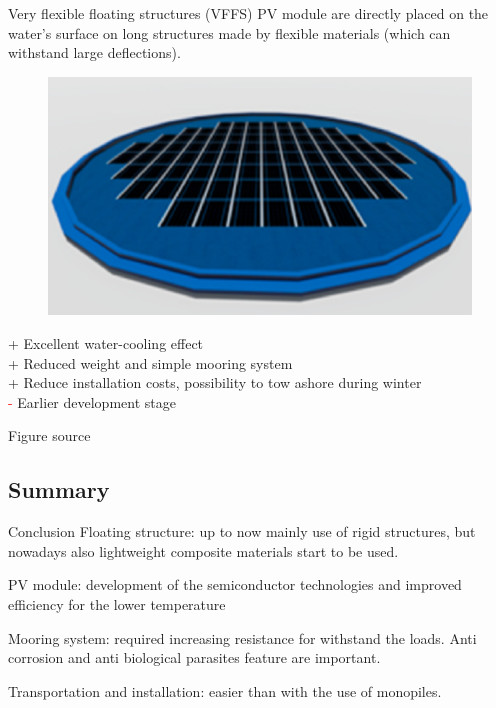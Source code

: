 \documentclass[aspectratio=169, 12pt]{beamer}
\begin{document}
\begin{frame}{Very flexible floating structures (VFFS)}
  PV module are directly placed on the water's surface on long structures made by flexible materials (which can withstand large deflections).

  \begin{figure}
    \centering
    \includegraphics[width=0.3\columnwidth]{figure/vffs.png}
  \end{figure}

  \textcolor{NTNUgreen}{+} Excellent water-cooling effect\\
  \textcolor{NTNUgreen}{+} Reduced weight and simple mooring system\\
  \textcolor{NTNUgreen}{+} Reduce installation costs, possibility to tow ashore during winter\\
  \textcolor{red}{-} Earlier development stage

  {\tiny Figure source \cite{vffs_figure}}
\end{frame}

\subsection{Summary}
\begin{frame}{Conclusion}
  \textcolor{NTNUBlue}{Floating structure}: up to now mainly use of rigid structures, but nowadays also lightweight composite materials start to be used.

  \textcolor{NTNUBlue}{PV module}: development of the semiconductor technologies and improved efficiency for the lower temperature

  \textcolor{NTNUBlue}{Mooring system}: required increasing resistance for withstand the loads. Anti corrosion and anti biological parasites feature are important. 

  \textcolor{NTNUBlue}{Transportation and installation}: easier than with the use of monopiles.

\end{frame}

                                  
\end{document}
